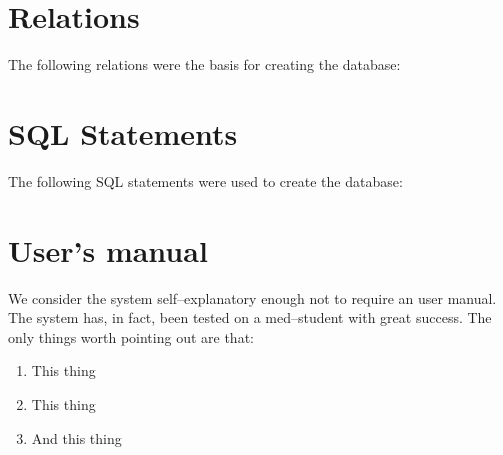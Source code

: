 \documentclass[a4paper]{scrartcl}
\numberwithin{equation}{section}
\begin{document}
\section*{Relations}
The following relations were the basis for creating the database:


\section*{SQL Statements}
The following SQL statements were used to create the database:


\section*{User's manual}
We consider the system self--explanatory enough not to require an user manual. 
The system has, in fact, been tested on a med--student with great success.
The only things worth pointing out are that:

\begin{enumerate}
  \item This thing
  \item This thing
  \item And this thing
\end{enumerate}

% 






    

\end{document}
